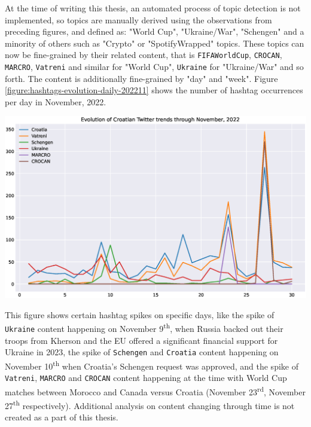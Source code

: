 At the time of writing this thesis, an automated process of topic detection is not implemented, so topics are manually derived using the observations from preceding figures, and defined as: "World Cup", "Ukraine/War", "Schengen" and a minority of others such as "Crypto" or "SpotifyWrapped" topics. These topics can now be fine-grained by their related content, that is \texttt{FIFAWorldCup}, \texttt{CROCAN}, \texttt{MARCRO}, \texttt{Vatreni} and similar for "World Cup", \texttt{Ukraine} for "Ukraine/War" and so forth. The content is additionally fine-grained by "day" and "week". Figure \ref{figure:hashtags-evolution-daily-202211} shows the number of hashtag occurrences per day in November, 2022.

\begin{center}
\includegraphics[width=16cm,keepaspectratio]{figures/hashtags-evolution-daily-202211.eps}
\label{figure:hashtags-evolution-daily-202211}
\end{center}

This figure shows certain hashtag spikes on specific days, like the spike of \texttt{Ukraine} content happening on November 9\textsuperscript{th}, when Russia backed out their troops from Kherson and the EU offered a significant financial support for Ukraine in 2023\cite{euronews2022ukraine}, the spike of \texttt{Schengen} and \texttt{Croatia} content happening on November 10\textsuperscript{th} when Croatia's Schengen request was approved\cite{reuters2022croschengen}, and the spike of \texttt{Vatreni}, \texttt{MARCRO} and \texttt{CROCAN} content happening at the time with World Cup matches between Morocco and Canada versus Croatia (November 23\textsuperscript{rd}, November 27\textsuperscript{th} respectively). Additional analysis on content changing through time is not created as a part of this thesis.


